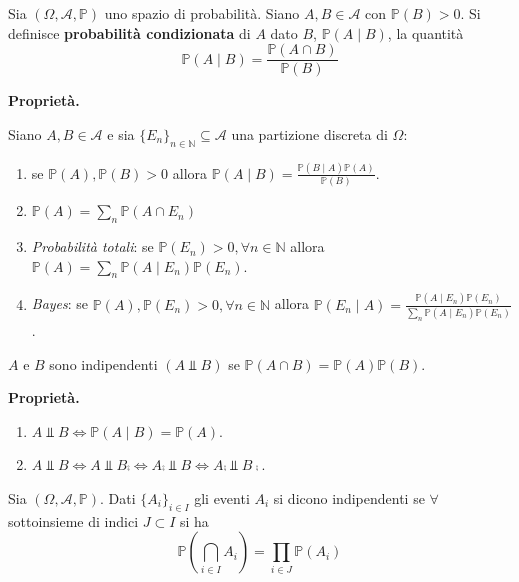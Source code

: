 
\ParteEsercizi


\begin{definition}
Sia $( \Omega ,\mathcal{A} ,\mathbb{P})$ uno spazio di probabilità. Siano $A,B\in \mathcal{A}$ con $\mathbb{P}( B)  >0$. Si definisce \textbf{probabilità condizionata} di $A$ dato $B$, $\mathbb{P}( A\mid B)$, la quantità
\begin{equation*}
\mathbb{P}( A\mid B) =\frac{\mathbb{P}( A\cap B)}{\mathbb{P}( B)}
\end{equation*}
\end{definition}
\textbf{Proprietà.}

Siano $A,B\in \mathcal{A}$ e sia $\{E_{n}\}_{n\in \mathbb{N}} \subseteq \mathcal{A}$ una partizione discreta di $\Omega $:
\begin{enumerate}
\item se $\mathbb{P}( A) ,\mathbb{P}( B)  >0$ allora $\mathbb{P}( A\mid B) =\frac{\mathbb{P}( B\mid A)\mathbb{P}( A)}{\mathbb{P}( B)}$.
\item $\mathbb{P}( A) =\sum\limits _{n}\mathbb{P}( A\cap E_{n})$
\item \textit{Probabilità totali}: se $\mathbb{P}( E_{n})  >0,\forall n\in \mathbb{N}$ allora $\mathbb{P}( A) =\sum\limits _{n}\mathbb{P}( A\mid E_{n})\mathbb{P}( E_{n})$.
\item \textit{Bayes}: se $\mathbb{P}( A) ,\mathbb{P}( E_{n})  >0,\forall n\in \mathbb{N}$ allora $\mathbb{P}( E_{n} \mid A) =\frac{\mathbb{P}( A\mid E_{n})\mathbb{P}( E_{n})}{\sum\limits _{n}\mathbb{P}( A\mid E_{n})\mathbb{P}( E_{n})}$.
\end{enumerate}
\begin{definition}
$A$ e $B$ sono indipendenti $( A\Bot B)$ se $\mathbb{P}( A\cap B) =\mathbb{P}( A)\mathbb{P}( B)$.
\end{definition}
\textbf{Proprietà.}
\begin{enumerate}
\item $A\Bot B\iff \mathbb{P}( A\mid B) =\mathbb{P}( A)$.
\item $A\Bot B\iff A\Bot B\comp \iff A\comp \Bot B\iff A\comp \Bot B\comp$.
\end{enumerate}
\begin{definition}
Sia $( \Omega ,\mathcal{A} ,\mathbb{P})$. Dati $\{A_{i}\}_{i\in I}$ gli eventi $A_{i}$ si dicono indipendenti se $\forall $ sottoinsieme di indici $J\subset I$ si ha
\begin{equation*}
\mathbb{P}\left(\bigcap _{i\in I} A_{i}\right) =\prod _{i\in J}\mathbb{P}( A_{i})
\end{equation*}
\end{definition}
\Esercizio{}

